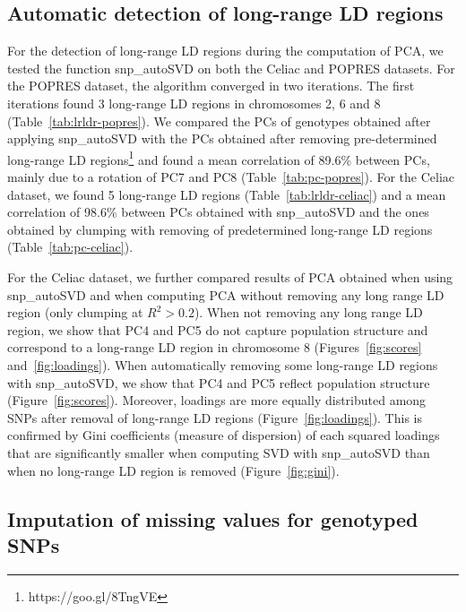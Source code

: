 \documentclass{bioinfo}
\begin{document}
\subsection{Automatic detection of long-range LD regions}

For the detection of long-range LD regions during the computation of PCA, we tested the function snp\_autoSVD on both the Celiac and POPRES datasets. For the POPRES dataset, the algorithm converged in two iterations. The first iterations found 3 long-range LD regions in chromosomes 2, 6 and 8 (Table~\ref{tab:lrldr-popres}). 
We compared the PCs of genotypes obtained after applying snp\_autoSVD with the PCs obtained after removing pre-determined long-range LD regions\footnote{https://goo.gl/8TngVE} and found a mean correlation of 89.6\% between PCs, mainly due to a rotation of PC7 and PC8 (Table~\ref{tab:pc-popres}). For the Celiac dataset, we found 5 long-range LD regions (Table~\ref{tab:lrldr-celiac}) and a mean correlation of 98.6\% between PCs obtained with snp\_autoSVD and the ones obtained by clumping with removing of predetermined long-range LD regions (Table~\ref{tab:pc-celiac}).

For the Celiac dataset, we further compared results of PCA obtained when using snp\_autoSVD and when computing PCA without removing any long range LD region (only clumping at $R^2 > 0.2$). 
When not removing any long range LD region, we show that PC4 and PC5 do not capture population structure and correspond to a long-range LD region in chromosome 8 (Figures~\ref{fig:scores} and~\ref{fig:loadings}). 
When automatically removing some long-range LD regions with snp\_autoSVD, we show that PC4 and PC5 reflect population structure (Figure~\ref{fig:scores}). Moreover, loadings are more equally distributed among SNPs after removal of long-range LD regions (Figure~\ref{fig:loadings}). 
This is confirmed by Gini coefficients (measure of dispersion) of each squared loadings that are significantly smaller when computing SVD with snp\_autoSVD than when no long-range LD region is removed (Figure~\ref{fig:gini}).

\subsection{Imputation of missing values for genotyped SNPs}\label{sec:impute}
\end{document}
